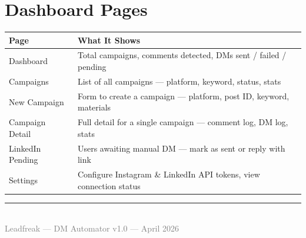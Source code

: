 \documentclass[12pt,a4paper]{article}
\begin{document}
\section{Dashboard Pages}

\begin{tabularx}{\textwidth}{lX}
\toprule
\textbf{Page} & \textbf{What It Shows} \\
\midrule
Dashboard & Total campaigns, comments detected, DMs sent / failed / pending \\[0.3em]
Campaigns & List of all campaigns --- platform, keyword, status, stats \\[0.3em]
New Campaign & Form to create a campaign --- platform, post ID, keyword, materials \\[0.3em]
Campaign Detail & Full detail for a single campaign --- comment log, DM log, stats \\[0.3em]
LinkedIn Pending & Users awaiting manual DM --- mark as sent or reply with link \\[0.3em]
Settings & Configure Instagram \& LinkedIn API tokens, view connection status \\
\bottomrule
\end{tabularx}

\vfill
\begin{center}
\rule{0.3\textwidth}{0.4pt}\\[0.5em]
{\small\textcolor{gray}{Leadfreak --- DM Automator v1.0 --- April 2026}}
\end{center}
\end{document}
